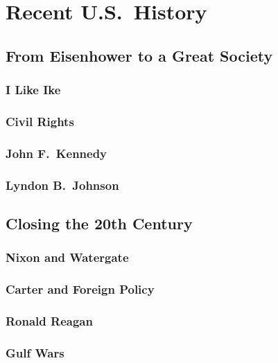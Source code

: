 \chapter{Recent U.S.\ History}

\section{From Eisenhower to a Great Society}

\subsection*{I Like Ike}

\subsection*{Civil Rights}

\subsection*{John F.\ Kennedy}

\subsection*{Lyndon B.\ Johnson}

\section{Closing the 20th Century}

\subsection*{Nixon and Watergate}

\subsection*{Carter and Foreign Policy}

\subsection*{Ronald Reagan}

\subsection*{Gulf Wars}
